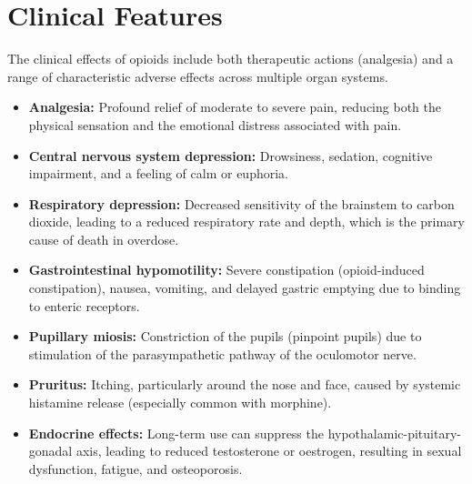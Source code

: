 \section*{Clinical Features}
The clinical effects of opioids include both therapeutic actions (analgesia) and a range of characteristic adverse effects across multiple organ systems.
\begin{itemize}
    \item \textbf{Analgesia:} Profound relief of moderate to severe pain, reducing both the physical sensation and the emotional distress associated with pain.
    \item \textbf{Central nervous system depression:} Drowsiness, sedation, cognitive impairment, and a feeling of calm or euphoria.
    \item \textbf{Respiratory depression:} Decreased sensitivity of the brainstem to carbon dioxide, leading to a reduced respiratory rate and depth, which is the primary cause of death in overdose.
    \item \textbf{Gastrointestinal hypomotility:} Severe constipation (opioid-induced constipation), nausea, vomiting, and delayed gastric emptying due to binding to enteric receptors.
    \item \textbf{Pupillary miosis:} Constriction of the pupils (pinpoint pupils) due to stimulation of the parasympathetic pathway of the oculomotor nerve.
    \item \textbf{Pruritus:} Itching, particularly around the nose and face, caused by systemic histamine release (especially common with morphine).
    \item \textbf{Endocrine effects:} Long-term use can suppress the hypothalamic-pituitary-gonadal axis, leading to reduced testosterone or oestrogen, resulting in sexual dysfunction, fatigue, and osteoporosis.
\end{itemize}

